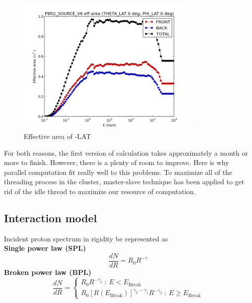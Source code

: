 \begin{figure}[h!]
    \centering
    \includegraphics[width=0.8\textwidth]{img/eff_energy_dist}
    \caption{Effective area of -LAT}
    \label{fig:lateff}
\end{figure}

For both reasons, the first version of calculation takes approximately a month or more to finish.
However, there is a plenty of room to improve. Here is why parallel computation fit really well to this problems.
To maximize all of the threading process in the cluster, master-slave technique has been applied to get rid of the idle thread to maximize our resource of computation.


\subsection{Interaction model}
Incident proton spectrum in rigidity be represented as \\
\textbf{Single power law (SPL)}
\begin{equation}
    \frac{dN}{dR} = R_0R^{-\gamma}
    \label{eq:spl}
\end{equation}
\textbf{Broken power law (BPL)}
\begin{equation}
\frac{dN}{dR}=
  \begin{cases}
    R_0R^{-\gamma_1}\ :\ E < E_{\text{Break}}\\
    R_0[R(E_{\text{Break}})]^{\gamma_2-\gamma_1}R^{-\gamma_2}\ :\ E \ge E_{\text{Break}}
  \end{cases}
  \label{eq:bpl}
\end{equation}

